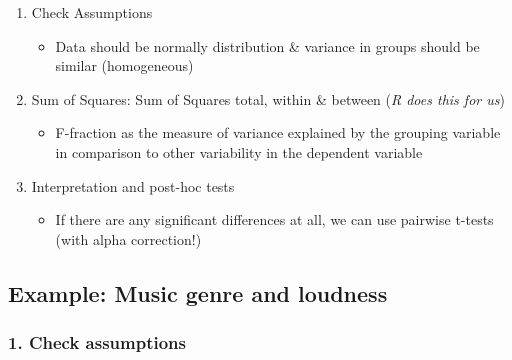 \documentclass[
]{book}
\providecommand{\tightlist}{%
  \setlength{\itemsep}{0pt}\setlength{\parskip}{0pt}}
\begin{document}
\begin{enumerate}
\def\labelenumi{\arabic{enumi}.}
\tightlist
\item
  Check Assumptions

  \begin{itemize}
  \tightlist
  \item
    Data should be normally distribution \& variance in groups should be similar (homogeneous)
  \end{itemize}
\item
  Sum of Squares: Sum of Squares total, within \& between (\emph{R does this for us})

  \begin{itemize}
  \tightlist
  \item
    F-fraction as the measure of variance explained by the grouping variable in comparison to other variability in the dependent variable
  \end{itemize}
\item
  Interpretation and post-hoc tests

  \begin{itemize}
  \tightlist
  \item
    If there are any significant differences at all, we can use pairwise t-tests (with alpha correction!)
  \end{itemize}
\end{enumerate}

\subsection*{\texorpdfstring{Example: Music genre and loudness }{Example: Music genre and loudness }}\label{example-music-genre-and-loudness}

\subsubsection*{1. Check assumptions}\label{check-assumptions}
\end{document}
